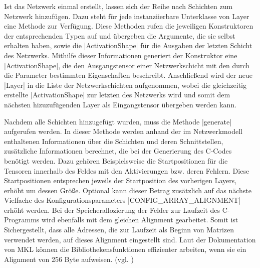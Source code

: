 \documentclass[../main.tex]{subfiles}
\begin{document}
Ist das Netzwerk einmal erstellt, lassen sich der Reihe nach Schichten zum Netzwerk hinzufügen. Dazu steht für jede instanziierbare Unterklasse von Layer eine Methode zur Verfügung. Diese Methoden rufen die jeweiligen Konstruktoren der entsprechenden Typen auf und übergeben die Argumente, die sie selbst erhalten haben, sowie die |ActivationShape| für die Ausgaben der letzten Schicht des Netzwerks. Mithilfe dieser Informationen generiert der Konstruktor eine |ActivationShape|, die den Ausgangstensor einer Netzwerkschicht mit den durch die Parameter bestimmten Eigenschaften beschreibt. Anschließend wird der neue |Layer| in die Liste der Netzwerkschichten aufgenommen, wobei die gleichzeitig erstellte |ActivationShape| zur letzten des Netzwerks wird und somit dem nächsten hizuzufügenden Layer als Eingangstensor übergeben werden kann. 

Nachdem alle Schichten hinzugefügt wurden, muss die Methode |generate| aufgerufen werden. In dieser Methode werden anhand der im Netzwerkmodell enthaltenen Informationen über die Schichten und deren Schnittstellen, zusätzliche Informationen berechnet, die bei der Generierung des C-Codes benötigt werden. Dazu gehören Beispielsweise die Startpositionen für die Tensoren innerhalb des Feldes mit den Aktivierungen bzw. deren Fehlern. Diese Startpositionen entsprechen jeweils der Startposition des vorherigen Layers, erhöht um dessen Größe. Optional kann dieser Betrag zusätzlich auf das nächste Vielfache des Konfigurationsparameters |CONFIG_ARRAY_ALIGNMENT| erhöht werden. Bei der Speicherallozierung der Felder zur Laufzeit des C-Programms wird ebenfalls mit dem gleichen Alignment gearbeitet. Somit ist Sichergestellt, dass alle Adressen, die zur Laufzeit als Beginn von Matrizen verwendet werden, auf dieses Alignment eingestellt sind. Laut der Dokumentation von MKL können die Bibliothekensfunktionen effizienter arbeiten, wenn sie ein Alignment von 256 Byte aufweisen. (vgl. \cite{MKLdevReference}) 
\end{document}
